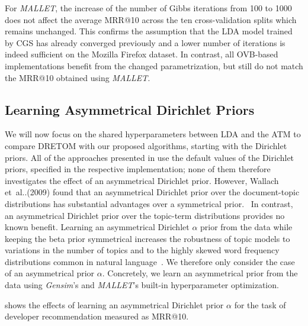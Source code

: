 \documentclass[a4paper,twoside]{article}
\makeatletter
\DeclareRobustCommand\onedot{\futurelet\@let@token\@onedot}
\def\@onedot{\ifx\@let@token.\else.\null\fi\xspace}
\def\etal{et~al\onedot}
\makeatother
\begin{document}
For \textit{MALLET}, the increase of the number of Gibbs iterations from 100 to 1000 does not affect the average \ac{MRR}@10 across the ten cross-validation splits which remains unchanged.
This confirms the assumption that the \ac{LDA} model trained by \ac{CGS} has already converged previously and a lower number of iterations is indeed sufficient on the Mozilla Firefox dataset.
In contrast, all \ac{OVB}-based implementations benefit from the changed parametrization, but still do not match the \ac{MRR}@10 obtained using \textit{MALLET}.

\subsection{Learning Asymmetrical Dirichlet Priors}
\label{sec:exp5}
We will now focus on the shared hyperparameters between \ac{LDA} and the \ac{ATM} to compare \ac{DRETOM} with our proposed algorithms, starting with the Dirichlet priors.
All of the approaches presented in  use the default values of the Dirichlet priors, specified in the respective implementation; none of them therefore investigates the effect of an asymmetrical Dirichlet prior.
However, Wallach \etal (2009) found that an asymmetrical Dirichlet prior over the document-topic distributions has substantial advantages over a symmetrical prior.~\nocite{Wallach2009RethinkingMatter}
In contrast, an asymmetrical Dirichlet prior over the topic-term distributions provides no known benefit.
Learning an asymmetrical Dirichlet $\alpha$ prior from the data while keeping the \gls{beta} prior symmetrical 
increases the robustness of topic models to variations in the number of topics
and to the highly skewed word frequency distributions common in natural language~\cite{Wallach2009RethinkingMatter}.
We therefore only consider the case of an asymmetrical prior $\alpha$.
Concretely, we learn an asymmetrical prior from the data using \textit{Gensim}'s and \textit{MALLET}'s built-in hyperparameter optimization.

 shows the effects of learning an asymmetrical Dirichlet prior $\alpha$
for the task of developer recommendation measured as \ac{MRR}@10.
\end{document}
